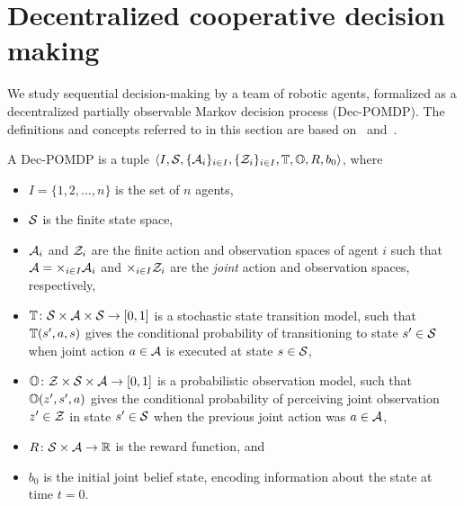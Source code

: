 \section{Decentralized cooperative decision making}
\label{sec:decpomdp}
We study sequential decision-making by a team of robotic agents, formalized as a decentralized partially observable Markov decision process (Dec-POMDP).
The definitions and concepts referred to in this section are based on~\cite{Oliehoek2008} and~\cite{Oliehoek2016}.
\begin{definition}
\label{def:decpomdp}
A Dec-POMDP is a tuple $\langle I, \mathcal{S}, \lbrace \mathcal{A}_i \rbrace_{i\in I}, \lbrace \mathcal{Z}_i \rbrace_{i\in I}, \mathbb{T}, \mathbb{O}, R, b_0 \rangle$, where
\begin{itemize}
\item $I=\{1,2,\ldots,n \}$ is the set of $n$ agents,
\item $\mathcal{S}$ is the finite state space,
\item $\mathcal{A}_i$ and $\mathcal{Z}_i$ are the finite action and observation spaces of agent $i$ such that $\mathcal{A} = \times_{i\in I} \mathcal{A}_i$ and $\times_{i\in I} \mathcal{Z}_i$ are the \emph{joint} action and observation spaces, respectively,
\item $\mathbb{T}\colon\mathcal{S}\times\mathcal{A}\times\mathcal{S}\to [0,1]$ is a stochastic state transition model, such that $\mathbb{T}(s',a,s)$ gives the conditional probability of transitioning to state $s'\in\mathcal{S}$ when joint action $a\in\mathcal{A}$ is executed at state $s\in\mathcal{S}$,
\item $\mathbb{O}\colon\mathcal{Z}\times\mathcal{S}\times\mathcal{A}\to[0,1]$ is a probabilistic observation model, such that $\mathbb{O}(z',s',a)$ gives the conditional probability of perceiving joint observation $z'\in\mathcal{Z}$ in state $s'\in\mathcal{S}$ when the previous joint action was $a\in\mathcal{A}$,
\item  $R\colon\mathcal{S}\times\mathcal{A}\to\mathbb{R}$ is the reward function, and
\item $b_0$ is the initial joint belief state, encoding information about the state at time $t=0$.
\end{itemize}
\end{definition}


